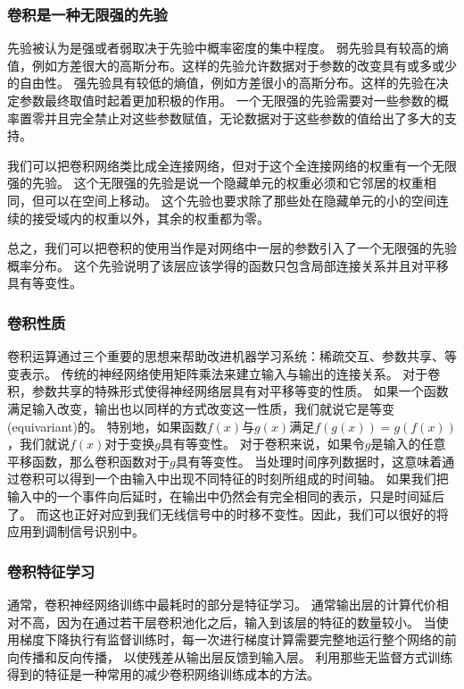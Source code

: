 \subsubsection{卷积是一种无限强的先验}
先验被认为是强或者弱取决于先验中概率密度的集中程度。
弱先验具有较高的熵值，例如方差很大的高斯分布。这样的先验允许数据对于参数的改变具有或多或少的自由性。
强先验具有较低的熵值，例如方差很小的高斯分布。这样的先验在决定参数最终取值时起着更加积极的作用。
一个无限强的先验需要对一些参数的概率置零并且完全禁止对这些参数赋值，无论数据对于这些参数的值给出了多大的支持。\par
我们可以把卷积网络类比成全连接网络，但对于这个全连接网络的权重有一个无限强的先验。
这个无限强的先验是说一个隐藏单元的权重必须和它邻居的权重相同，但可以在空间上移动。
这个先验也要求除了那些处在隐藏单元的小的空间连续的接受域内的权重以外，其余的权重都为零。\par
总之，我们可以把卷积的使用当作是对网络中一层的参数引入了一个无限强的先验概率分布。
这个先验说明了该层应该学得的函数只包含局部连接关系并且对平移具有等变性。\par

\subsubsection{卷积性质}
卷积运算通过三个重要的思想来帮助改进机器学习系统：稀疏交互、参数共享、等变表示。
传统的神经网络使用矩阵乘法来建立输入与输出的连接关系。
对于卷积，参数共享的特殊形式使得神经网络层具有对平移等变的性质。
如果一个函数满足输入改变，输出也以同样的方式改变这一性质，我们就说它是等变(equivariant)的。
特别地，如果函数$f(x)$与$g(x)$满足$f(g(x))= g(f(x))$，我们就说$f(x)$对于变换$g$具有等变性。
对于卷积来说，如果令$g$是输入的任意平移函数，那么卷积函数对于$g$具有等变性。
当处理时间序列数据时，这意味着通过卷积可以得到一个由输入中出现不同特征的时刻所组成的时间轴。
如果我们把输入中的一个事件向后延时，在输出中仍然会有完全相同的表示，只是时间延后了。
而这也正好对应到我们无线信号中的时移不变性。因此，我们可以很好的将\label{con_net}应用到调制信号识别中。\par

\subsubsection{卷积特征学习}
通常，卷积神经网络训练中最耗时的部分是特征学习。 
通常输出层的计算代价相对不高，因为在通过若干层卷积池化之后，输入到该层的特征的数量较小。
当使用梯度下降执行有监督训练时，每一次进行梯度计算需要完整地运行整个网络的前向传播和反向传播，
以使残差从输出层反馈到输入层。
利用那些无监督方式训练得到的特征是一种常用的减少卷积网络训练成本的方法。\par

